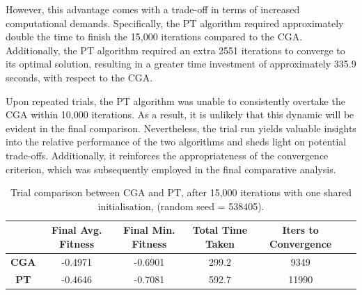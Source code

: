 \documentclass[10pt]{article}
\begin{document}
\begin{multicols}{2}
However, this advantage comes with a trade-off in terms of increased computational demands. Specifically, the PT algorithm required approximately double the time to finish the 15,000 iterations compared to the CGA. Additionally, the PT algorithm required an extra 2551 iterations to converge to its optimal solution, resulting in a greater time investment of approximately 335.9 seconds, with respect to the CGA.

Upon repeated trials, the PT algorithm was unable to consistently overtake the CGA within 10,000 iterations. As a result, it is unlikely that this dynamic will be evident in the final comparison. Nevertheless, the trial run yields valuable insights into the relative performance of the two algorithms and sheds light on potential trade-offs. Additionally, it reinforces the appropriateness of the convergence criterion, which was subsequently employed in the final comparative analysis.

\end{multicols}
\begin{table}[H]
    \centering
    \begin{tabular}{|c|c|c|c|c|c|}
    \hline
    & \textbf{Final Avg. Fitness} & \textbf{Final Min. Fitness} & \textbf{Total Time Taken} & \textbf{Iters to Convergence} \\
    \hline
    \textbf{CGA} & -0.4971 & -0.6901 & 299.2 & 9349 \\
    \textbf{PT} & -0.4646 & -0.7081 & 592.7 & 11990 \\
    \hline
    \end{tabular}
    \caption{Trial comparison between CGA and PT, after 15,000 iterations with one shared initialisation, (random seed = 538405).}
    \label{tab:trial_comparison}
\end{table}
\end{document}
